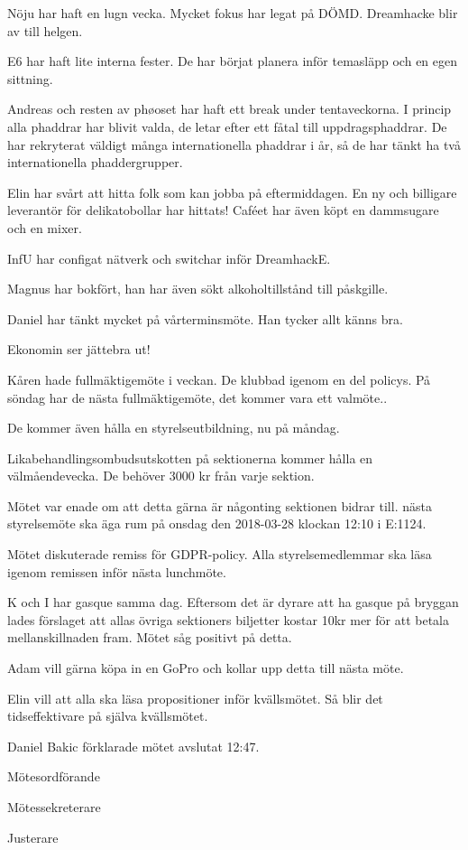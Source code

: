 \documentclass[10pt]{article}
\def\mo{Daniel Bakic}
\def\ms{Axel Voss}
\def\ji{Fanny Månefjord}
\begin{document}
\begin{paragrafer}
\begin{paragrafer}
		Nöju har haft en lugn vecka. Mycket fokus har legat på DÖMD. Dreamhacke blir av till helgen.
		
		E6 har haft lite interna fester. De har börjat planera inför temasläpp och en egen sittning.
		
		Andreas och resten av phøoset har haft ett break under tentaveckorna. I princip alla phaddrar har blivit valda, de letar efter ett fåtal till uppdragsphaddrar. De har rekryterat väldigt många internationella phaddrar i år, så de har tänkt ha två internationella phaddergrupper.
		
		Elin har svårt att hitta folk som kan jobba på eftermiddagen. En ny och billigare leverantör för delikatobollar har hittats! Caféet har även köpt en dammsugare och en mixer.
		
		InfU har configat nätverk och switchar inför DreamhackE.
		
		Magnus har bokfört, han har även sökt alkoholtillstånd till påskgille.
		
		Daniel har tänkt mycket på vårterminsmöte. Han tycker allt känns bra.
		
		Ekonomin ser jättebra ut!
		
		
		Kåren hade fullmäktigemöte i veckan. De klubbad igenom en del policys.
		På söndag har de nästa fullmäktigemöte, det kommer vara ett valmöte..
		
		De kommer även hålla en styrelseutbildning, nu på måndag.
		
	\end{paragrafer}
	
	
	Likabehandlingsombudsutskotten på sektionerna kommer hålla en välmåendevecka. De behöver 3000 kr från varje sektion.
	
	Mötet var enade om att detta gärna är någonting sektionen bidrar till. 
	\Mba nästa styrelsemöte ska äga rum på onsdag den 2018-03-28 klockan 12:10 i E:1124.
	
	
	\Ibfu
	
	
	
	Mötet diskuterade remiss för GDPR-policy. Alla styrelsemedlemmar ska läsa igenom remissen inför nästa lunchmöte.
	
	K och I har gasque samma dag. Eftersom det är dyrare att ha gasque på bryggan lades förslaget att allas övriga sektioners biljetter kostar 10kr mer för att betala mellanskillnaden fram. Mötet såg positivt på detta.
	  
	Adam vill gärna köpa in en GoPro och kollar upp detta till nästa möte.
	
	Elin vill att alla ska läsa propositioner inför kvällsmötet. Så blir det tidseffektivare på själva kvällsmötet.
	
	{\mo} förklarade mötet avslutat 12:47.
\end{paragrafer}

\hidesignfoot
\begin{signatures}{3}
	\signature{\mo}{Mötesordförande}
	\signature{\ms}{Mötessekreterare}
	\signature{\ji}{Justerare}
\end{signatures}
\end{document}
